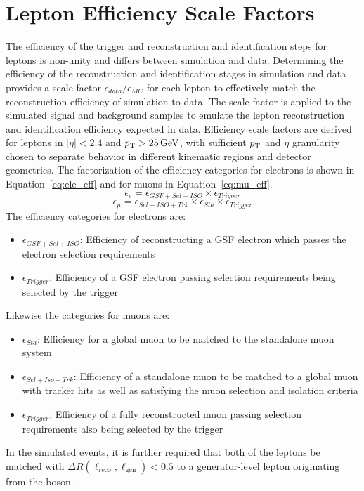 
\chapter{Lepton Efficiency Scale Factors}\label{ch:eff}
The efficiency of the trigger and reconstruction and identification steps for leptons is non-unity and differs between simulation and data. Determining the efficiency of the reconstruction and identification stages in simulation and data provides a scale factor $\epsilon_{data}/\epsilon_{MC}$ for each lepton to effectively match the reconstruction efficiency of simulation to data. The scale factor is applied to the simulated signal and background samples to emulate the lepton reconstruction and identification efficiency expected in data. Efficiency scale factors are derived for leptons in $|\eta|<2.4$ and $p_{\mathrm{T}}>25\,\text{Ge\hspace{-.08em}V}$, with sufficient $p_{\mathrm{T}}$ and $\eta$ granularity chosen to separate behavior in different kinematic regions and detector geometries. The factorization of the efficiency categories for electrons is shown in Equation~\ref{eq:ele_eff} and for muons in Equation~\ref{eq:mu_eff}.
\begin{equation}
  \epsilon_{e} = \epsilon_{GSF+Sel+ISO} \times \epsilon_{Trigger}
  \label{eq:ele_eff}
\end{equation}
\begin{equation}
  \epsilon_{\mu} = \epsilon_{Sel+ISO+Trk} \times  \epsilon_{Sta} \times \epsilon_{Trigger}
  \label{eq:mu_eff}
\end{equation}
The efficiency categories for electrons are:
\begin{itemize}
    \item $\epsilon_{GSF+Sel+ISO}$: Efficiency of reconstructing a GSF electron which passes the electron selection requirements
    \item $\epsilon_{Trigger}$: Efficiency of a GSF electron passing selection requirements being selected by the trigger
\end{itemize}
Likewise the categories for muons are:
\begin{itemize}
    \item $\epsilon_{Sta}$: Efficiency for a global muon to be matched to the standalone muon system
    \item $\epsilon_{Sel+Iso+Trk}$: Efficiency of a standalone muon to be matched to a global muon with tracker hits as well as satisfying the muon selection and isolation criteria
    \item $\epsilon_{Trigger}$: Efficiency of a fully reconstructed muon passing selection requirements also being selected by the trigger
\end{itemize}
In the simulated \zll events, it is further required that both of the leptons be matched with $\Delta R(\ell_{\mathrm{reco}},\ell_{\mathrm{gen}}) < 0.5$ to a generator-level lepton originating from the \Z boson. 


